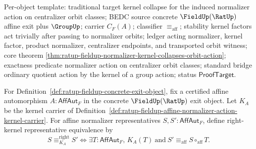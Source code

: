 Per-object template: traditional target kernel collapse for the induced
normalizer action on centralizer orbit classes; BEDC source concrete
$\FieldUp(\RatUp)$ affine exit plus $\GroupUp$; carrier $C_F(A)$; classifier
$\equiv_{\mathrm{aff}}$; stability kernel factors act trivially after passing
to normalizer orbits; ledger acting normalizer, kernel factor, product
normalizer, centralizer endpoints, and transported orbit witness; core theorem
\autoref{thm:ratup-fieldup-normalizer-kernel-collapses-orbit-action};
exactness predicate normalizer action on centralizer orbit classes; standard
bridge ordinary quotient action by the kernel of a group action; status
$\mathsf{ProofTarget}$.

\begin{definition}
\label{def:ratup-fieldup-right-kernel-normalizer-representatives}
For Definition~\ref{def:ratup-fieldup-concrete-exit-object}, fix a certified
affine automorphism $A:\mathsf{AffAut}_F$ in the concrete $\FieldUp(\RatUp)$
exit object. Let $K_A$ be the kernel carrier of
Definition~\ref{def:ratup-fieldup-affine-normalizer-action-kernel-carrier}.
For affine normalizer representatives $S,S':\mathsf{AffAut}_F$, define
right-kernel representative equivalence by
$$
S\equiv_{K_A}^{\mathrm{right}}S'
\Longleftrightarrow
\exists T:\mathsf{AffAut}_F,\,
K_A(T)\ \text{and}\ S'\equiv_{\mathrm{aff}}S\circ_{\mathrm{aff}}T.
$$
\end{definition}


